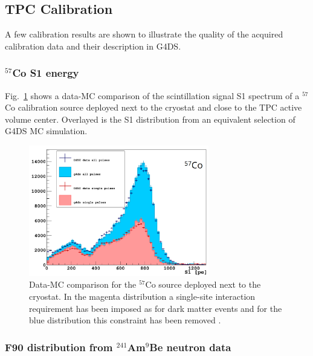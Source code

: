 \subsection{TPC Calibration}
A few calibration results are shown to illustrate the quality of the acquired calibration data and their description in G4DS.

\subsubsection{$^{57}$Co S1 energy}
Fig.~\ref{fig:CalibData:Co57} shows a data-MC comparison of the scintillation signal S1 spectrum of a $^{57}$Co calibration source deployed next to the cryostat and close to the TPC active volume center. Overlayed is the S1 distribution from an equivalent selection of G4DS MC simulation.

\begin{figure}[htbp]
\centering
\includegraphics[width=0.7\textwidth]{./Figures/57Co_Paolo_G4DS_UCLA.png}
\caption{Data-MC comparison for the $^{57}$Co source deployed next to the cryostat. In the magenta distribution a single-site interaction requirement has been imposed as for dark matter events and for the blue distribution this constraint has been removed \cite{DS50:G4DS:paper}.
\label{fig:CalibData:Co57}}
 \end{figure}


\subsubsection{F90 distribution from $^{241}$Am$^9$Be neutron data}\label{sec:CalibData:NR}

